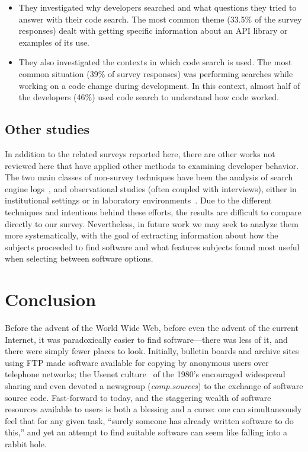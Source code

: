 \documentclass{casicswhitepaper}
\begin{document}
\begin{itemize}

\item They investigated why developers searched and what questions they tried to answer with their code search.  The most common theme (33.5\% of the survey responses) dealt with getting specific information about an API library or examples of its use.

\item They also investigated the contexts in which code search is used.  The most common situation (39\% of survey responses) was performing searches while working on a code change during development.  In this context, almost half of the developers (46\%) used code search to understand how code worked.

\end{itemize}


\subsection{Other studies}

In addition to the related surveys reported here, there are other works not reviewed here that have applied other methods to examining developer behavior.  The two main classes of non-survey techniques have been the analysis of search engine logs~\cite{bajrachary_2009, bajracharya2012analyzing, jansen_2006, teevan_2004, brandt2009two, brandt2010example, Li2009751, ge2014developers, volske2015users}, and observational studies (often coupled with interviews), either in institutional settings or in laboratory environments~\cite{sim_2011, brandt2009two, banker1993repository, gallardo2013software, sherif2003barriers, pohthong2001reuse, sim2013controlled, murphyhill2015how, sim2011getting, dabbish_2012}.  Due to the different techniques and intentions behind these efforts, the results are difficult to compare directly to our survey.  Nevertheless, in future work we may seek to analyze them more systematically, with the goal of extracting information about how the subjects proceeded to find software and what features subjects found most useful when selecting between software options.


\section{Conclusion}
\label{conclusion}

Before the advent of the World Wide Web, before even the advent of the current Internet, it was paradoxically easier to find software---there was less of it, and there were simply fewer places to look.  Initially, bulletin boards and archive sites using FTP made software available for copying by anonymous users over telephone networks; the Usenet culture~\cite{emerson1983usenet} of the 1980's encouraged widespread sharing and even devoted a newsgroup (\emph{comp.sources}) to the exchange of software source code.  Fast-forward to today, and the staggering wealth of software resources available to users is both a blessing and a curse: one can simultaneously feel that for any given task, ``surely someone has already written software to do this,'' and yet an attempt to find suitable software can seem like falling into a rabbit hole.
\end{document}
